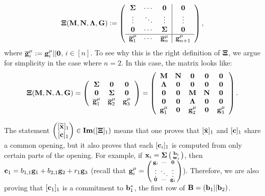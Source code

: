 $$\mathbf{{\Xi}}(\mathbf{{M}},\mathbf{{N}},\mathbf{{\Lambda}},\mathbf{{G}}):=
\left(\begin{array}{ccc|ccc}
\mathbf{{\Sigma}}             & \cdots & \mathbf{{0}}                  & \mathbf{{0}} \\
\vdots                    & \ddots & \vdots                    & \vdots   \\
\mathbf{{0}}                  & \cdots & \mathbf{{\Sigma}}             & \mathbf{{0}} \\
\hline
\overline{\mathbf{g}}_1^{\mu} & \cdots & \overline{\mathbf{g}}_n^{\mu} & \mathbf{g}_{n+1}^{\mu}
\end{array}\right),
$$ where $\overline{\mathbf{g}}_i^{\mu}:=\mathbf{g}_i^{\mu}||\mathbf{0}$, $i\in[n]$. To see why this is the right definition of $\mathbf{{\Xi}}$, we argue for simplicity in the case where $n=2$. In this case, the matrix looks like:   
$$\mathbf{{\Xi}}(\mathbf{{M}},\mathbf{{N}},\mathbf{{\Lambda}},\mathbf{{G}})=
\left(\begin{array}{cccc}
    \mathbf{{\Sigma}}             & \mathbf{{0}}                  & \mathbf{{0}}           \\
    \mathbf{{0}}                  & \mathbf{{\Sigma}}             & \mathbf{{0}}           \\
    \overline{\mathbf{g}}_1^{\mu} & \overline{\mathbf{g}}_2^{\mu} & \mathbf{g}_{3}^{\mu}
\end{array}\right)
=
\left(\begin{array}{ccccc}
    \mathbf{{M}}       & \mathbf{{N}}  & \mathbf{{0}}       & \mathbf{{0}} & \mathbf{{0}}         \\
    \mathbf{{\Lambda}} & \mathbf{{0}}  & \mathbf{{0}}       & \mathbf{{0}} & \mathbf{{0}}         \\
    \mathbf{{0}}       & \mathbf{{0}}  & \mathbf{{M}}       & \mathbf{{N}} & \mathbf{{0}}         \\
    \mathbf{{0}}       & \mathbf{{0}}  & \mathbf{{\Lambda}} & \mathbf{{0}} & \mathbf{{0}}         \\
    \mathbf{g}_1^{\mu} & \mathbf{0}  &\mathbf{g}_2^{\mu}  & \mathbf{0} & \mathbf{g}_{3}^{\mu}
\end{array}\right).
$$ 

The statement $\begin{pmatrix}[\widetilde{\vecb{x}}]_1 \\ [\vecb{c}]_1 \end{pmatrix} \in \mathbf{Im}([\matr{\Xi}]_1)$ means that one proves that
$[\tilde{\mathbf{x}}]_1$ and $[\mathbf{c}]_1$ share a common opening, but it also proves that each $[\mathbf{c}_i]_1$ is computed from only certain parts of the opening. For example, if $\mathbf{x}_i =\mathbf{{\Sigma}}\left(\begin{smallmatrix}\mathbf{b}_i\\\mathbf{w}_i\end{smallmatrix}\right)$, then $\mathbf{c}_1=b_{1,1}\mathbf{g}_1+b_{2,1}\mathbf{g}_2+r_1\mathbf{g}_3$ (recall that $\mathbf{g}_i^{\mu}=\left(\begin{smallmatrix}\mathbf{g}_i&\cdots&\mathbf{0}\\\vdots&\ddots&\vdots\\\mathbf{0}&\cdots&\mathbf{g}_i\end{smallmatrix}\right)$). Therefore, we are also proving that $[\mathbf{c}_1]_1$ is a commitment to $\mathbf{b}_1^*$, the first row of $\mathbf{{B}}=(\mathbf{b}_1||\mathbf{b}_2)$.
 
